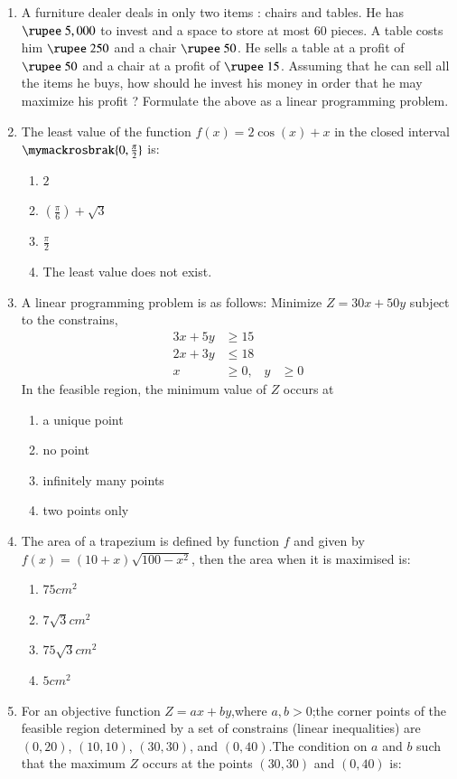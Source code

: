 \documentclass{article}
\begin{document}
\begin{enumerate}
 \item A furniture dealer deals in only two items : chairs and tables. He has $\rupee~5,000$  to invest and a space to store at most $60$ pieces. A table costs him $\rupee~250$ and a chair $\rupee~50$. He sells a table at a profit of $\rupee~50$ and a chair at
a profit of $\rupee~ 15$. Assuming that he can sell all the items he buys, how should he invest his money in order that he may maximize his profit ?
Formulate the above as a linear programming problem.
\item The least value of the function $f(x)=2\cos(x) + x$ in the closed interval $\mymackrosbrak{0, \frac{\pi}{2}}$ is: 
\begin{enumerate}
    \item  $2$
    \item  $\left(\frac{\pi}{6}\right) + \sqrt{3}$
    \item  $\frac{\pi}{2}$
    \item The least value does not exist.
\end{enumerate}
\item A linear programming problem is as follows:
Minimize $Z=30x+50y$ subject to the constrains,
\begin{align}
	3x+5y &\geq 15\\
	2x+3y &\leq 18\\
	x &\geq 0, &y &\geq 0
    \end{align}
In the feasible region, the minimum value of $Z$ occurs at 
\begin{enumerate}
    \item a unique point 
    \item no point
    \item infinitely many points 
    \item two points only
\end{enumerate}
\item The area of a trapezium is defined by function $f$
and given by $f(x)=(10+x)\sqrt{100-x^2}$, then the area when it is maximised is:
\begin{enumerate}
    \item $75cm^2$
    \item $7\sqrt{3}cm^2$
    \item $75\sqrt{3}cm^2$
    \item $5cm^2$
\end{enumerate}
\item For an objective function $Z=ax+by$,where $a,b>0$;the corner points of the feasible region determined by a set of constrains (linear inequalities) are $(0,20)$, $(10,10)$, $(30,30)$, and $(0,40)$.The condition on $a$ and $b$ such that the maximum $Z$ occurs at the points $(30,30)$ and $(0,40)$ is: 

\end{enumerate}
\end{document}
